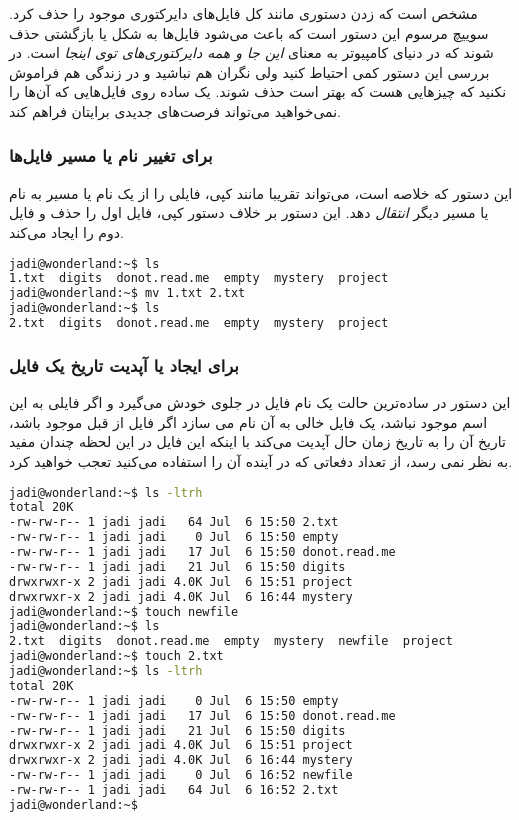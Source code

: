 مشخص است که زدن دستوری مانند
کل فایل‌های دایرکتوری موجود را حذف کرد. سوییچ مرسوم این دستور 
 است که باعث می‌شود فایل‌ها به شکل 
 یا بازگشتی حذف شوند که در دنیای کامپیوتر به معنای
\emph{این جا و همه دایرکتوری‌های توی اینجا}
است. در بررسی این دستور کمی احتیاط کنید ولی نگران هم نباشید و در زندگی هم فراموش نکنید که چیزهایی هست که بهتر است حذف شوند. یک  ساده روی فایل‌هایی که آن‌ها را نمی‌خواهید می‌تواند فرصت‌های جدیدی برایتان فراهم کند.
\subsubsection*{ برای تغییر نام یا مسیر فایل‌ها}
این دستور که خلاصه 
 است، می‌تواند تقریبا مانند کپی، فایلی را از یک نام یا مسیر به نام یا مسیر دیگر
\emph{انتقال}
دهد. این دستور بر خلاف دستور کپی، فایل‌ اول را حذف و فایل دوم را ایجاد می‌کند.

\begin{latin}
\begin{lstlisting}[language=bash,basicstyle=\ttfamily,linewidth=12cm]
jadi@wonderland:~$ ls
1.txt  digits  donot.read.me  empty  mystery  project
jadi@wonderland:~$ mv 1.txt 2.txt
jadi@wonderland:~$ ls
2.txt  digits  donot.read.me  empty  mystery  project
\end{lstlisting}
\end{latin}

\subsubsection*{ برای ایجاد یا آپدیت تاریخ یک فایل}
این دستور در ساده‌ترین حالت یک نام فایل در جلوی خودش می‌گیرد و
اگر فایلی به این اسم موجود نباشد، یک فایل خالی به آن نام می سازد
اگر فایل از قبل موجود باشد، تاریخ آن را به تاریخ زمان حال آپدیت می‌کند
با اینکه این فایل در این لحظه چندان مفید به نظر نمی رسد، از تعداد دفعاتی که در آینده آن را استفاده می‌کنید تعجب خواهید کرد.

\begin{latin}
\begin{lstlisting}[language=bash,basicstyle=\ttfamily,linewidth=12cm]
jadi@wonderland:~$ ls -ltrh
total 20K
-rw-rw-r-- 1 jadi jadi   64 Jul  6 15:50 2.txt
-rw-rw-r-- 1 jadi jadi    0 Jul  6 15:50 empty
-rw-rw-r-- 1 jadi jadi   17 Jul  6 15:50 donot.read.me
-rw-rw-r-- 1 jadi jadi   21 Jul  6 15:50 digits
drwxrwxr-x 2 jadi jadi 4.0K Jul  6 15:51 project
drwxrwxr-x 2 jadi jadi 4.0K Jul  6 16:44 mystery
jadi@wonderland:~$ touch newfile
jadi@wonderland:~$ ls
2.txt  digits  donot.read.me  empty  mystery  newfile  project
jadi@wonderland:~$ touch 2.txt 
jadi@wonderland:~$ ls -ltrh
total 20K
-rw-rw-r-- 1 jadi jadi    0 Jul  6 15:50 empty
-rw-rw-r-- 1 jadi jadi   17 Jul  6 15:50 donot.read.me
-rw-rw-r-- 1 jadi jadi   21 Jul  6 15:50 digits
drwxrwxr-x 2 jadi jadi 4.0K Jul  6 15:51 project
drwxrwxr-x 2 jadi jadi 4.0K Jul  6 16:44 mystery
-rw-rw-r-- 1 jadi jadi    0 Jul  6 16:52 newfile
-rw-rw-r-- 1 jadi jadi   64 Jul  6 16:52 2.txt
jadi@wonderland:~$ 
\end{lstlisting}
\end{latin}

